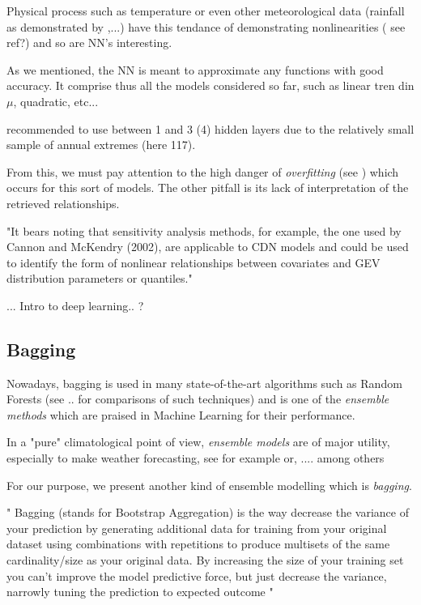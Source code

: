 \documentclass[11pt,a4paper,openany ]{book}
\begin{document}
Physical process such as temperature or even other meteorological data (rainfall as demonstrated by \citet{cannon_flexible_2010},...) have this tendance of demonstrating nonlinearities ( see ref?) and so are NN's interesting.

As we mentioned, the NN is meant to approximate any functions with good accuracy. It comprise thus all the models considered so far, such as linear tren din $\mu$, quadratic, etc...

\citet{cannon_flexible_2010} recommended to use between 1 and 3 (4) hidden layers due to the relatively small sample of annual extremes (here 117).


 From this, we must pay attention to the high danger of \emph{overfitting} (see ) which occurs for this sort of models. The other pitfall is its lack of interpretation of the retrieved relationships.
 
 "It bears noting that sensitivity analysis methods,
 for example, the one used by Cannon and McKendry
 (2002), are applicable to CDN models and could be used
 to identify the form of nonlinear relationships between
 covariates and GEV distribution parameters or quantiles."
 
 ... Intro to deep learning.. ?
 
\subsection{Bagging} 

Nowadays, bagging is used in 
many state-of-the-art algorithms such as Random Forests (see .. for comparisons of such techniques) and is one of the \emph{ensemble methods} which are praised in Machine Learning for their performance.  

In a "pure" climatological point of view, \emph{ensemble models} are of major utility, especially to make weather forecasting, see for example \citet{suh_development_2012} or, .... among others

For our purpose, we present another kind of ensemble modelling which is \emph{bagging}.

" Bagging (stands for Bootstrap Aggregation) is the way decrease the variance of your prediction by generating additional data for training from your original dataset using combinations with repetitions to produce multisets of the same cardinality/size as your original data. By increasing the size of your training set you can't improve the model predictive force, but just decrease the variance, narrowly tuning the prediction to expected outcome "
\end{document}
